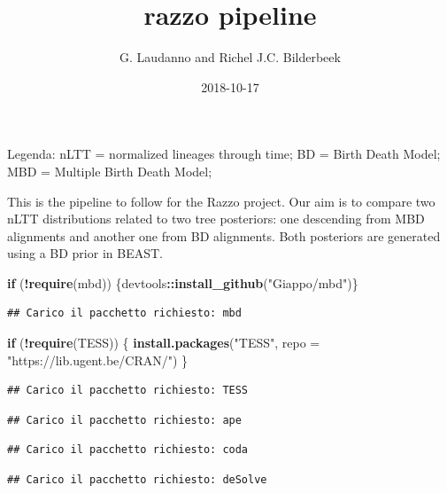 \documentclass[]{article}
\title{razzo pipeline}
\author{G. Laudanno and Richel J.C. Bilderbeek}
\date{2018-10-17}
\newenvironment{Shaded}{\begin{snugshade}}{\end{snugshade}}
\newcommand{\KeywordTok}[1]{\textcolor[rgb]{0.13,0.29,0.53}{\textbf{#1}}}
\newcommand{\DataTypeTok}[1]{\textcolor[rgb]{0.13,0.29,0.53}{#1}}
\newcommand{\StringTok}[1]{\textcolor[rgb]{0.31,0.60,0.02}{#1}}
\newcommand{\ControlFlowTok}[1]{\textcolor[rgb]{0.13,0.29,0.53}{\textbf{#1}}}
\newcommand{\OperatorTok}[1]{\textcolor[rgb]{0.81,0.36,0.00}{\textbf{#1}}}
\newcommand{\NormalTok}[1]{#1}
\begin{document}
\maketitle

Legenda: nLTT = normalized lineages through time; BD = Birth Death
Model; MBD = Multiple Birth Death Model;

This is the pipeline to follow for the Razzo project. Our aim is to
compare two nLTT distributions related to two tree posteriors: one
descending from MBD alignments and another one from BD alignments. Both
posteriors are generated using a BD prior in BEAST.

\begin{Shaded}
\begin{Highlighting}[]
\ControlFlowTok{if}\NormalTok{ (}\OperatorTok{!}\KeywordTok{require}\NormalTok{(mbd)) \{devtools}\OperatorTok{::}\KeywordTok{install_github}\NormalTok{(}\StringTok{"Giappo/mbd"}\NormalTok{)\}}
\end{Highlighting}
\end{Shaded}

\begin{verbatim}
## Carico il pacchetto richiesto: mbd
\end{verbatim}

\begin{Shaded}
\begin{Highlighting}[]
\ControlFlowTok{if}\NormalTok{ (}\OperatorTok{!}\KeywordTok{require}\NormalTok{(TESS)) \{}
  \KeywordTok{install.packages}\NormalTok{(}\StringTok{"TESS"}\NormalTok{, }\DataTypeTok{repo =} \StringTok{"https://lib.ugent.be/CRAN/"}\NormalTok{)}
\NormalTok{\}}
\end{Highlighting}
\end{Shaded}

\begin{verbatim}
## Carico il pacchetto richiesto: TESS
\end{verbatim}

\begin{verbatim}
## Carico il pacchetto richiesto: ape
\end{verbatim}

\begin{verbatim}
## Carico il pacchetto richiesto: coda
\end{verbatim}

\begin{verbatim}
## Carico il pacchetto richiesto: deSolve
\end{verbatim}
\end{document}
